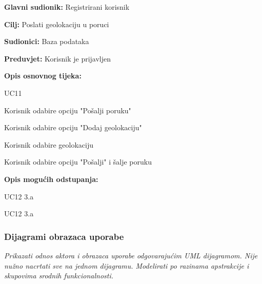 \noindent {}
\begin{packed_item}
	
	\item \textbf{Glavni sudionik: }Registrirani korisnik
	\item  \textbf{Cilj:} Poslati geolokaciju u poruci
	\item  \textbf{Sudionici:} Baza podataka
	\item  \textbf{Preduvjet:} Korisnik je prijavljen
	\item  \textbf{Opis osnovnog tijeka:}
	
	\item[] \begin{packed_enum}
		
		\item UC11
		\item Korisnik odabire opciju "Pošalji poruku"
		\item Korisnik odabire opciju "Dodaj geolokaciju"
		\item Korisnik odabire geolokaciju
		\item Korisnik odabire opciju "Pošalji" i šalje poruku
		
	\end{packed_enum}
	
	\item  \textbf{Opis mogućih odstupanja:}
	
	\item[] \begin{packed_item}
		
		\item[4.a] UC12 3.a
		\item[5.a] UC12 3.a
		
		
	\end{packed_item}
\end{packed_item}

\subsubsection{Dijagrami obrazaca uporabe}

\textit{Prikazati odnos aktora i obrazaca uporabe odgovarajućim UML dijagramom. Nije nužno nacrtati sve na jednom dijagramu. Modelirati po razinama apstrakcije i skupovima srodnih funkcionalnosti.}
\eject		

